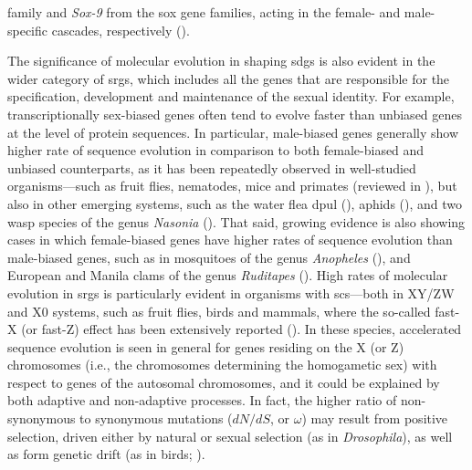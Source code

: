 family and \textit{Sox-9} from the \gls{sox} gene families, acting in the female- and male-specific cascades, respectively ().

The significance of molecular evolution in shaping \glspl{sdg} is also evident in the wider category of \glspl{srg}, which includes all the genes that are responsible for the specification, development and maintenance of the sexual identity. For example, transcriptionally sex-biased genes often tend to evolve faster than unbiased genes at the level of protein sequences. In particular, male-biased genes generally show higher rate of sequence evolution in comparison to both female-biased and unbiased counterparts, as it has been repeatedly observed in well-studied organisms---such as fruit flies, nematodes, mice and primates (reviewed in ), but also in other emerging systems, such as the water flea \gls{dpul} (), aphids (), and two wasp species of the genus \textit{Nasonia} (). That said, growing evidence is also showing cases in which female-biased genes have higher rates of sequence evolution than male-biased genes, such as in mosquitoes of the genus \textit{Anopheles} (), and European and Manila clams of the genus \textit{Ruditapes} (). High rates of molecular evolution in \glspl{srg} is particularly evident in organisms with \glspl{sc}---both in XY/ZW and X0 systems, such as fruit flies, birds and mammals, where the so-called fast-X (or fast-Z) effect has been extensively reported (). In these species, accelerated sequence evolution is seen in general for genes residing on the X (or Z) chromosomes (i.e., the chromosomes determining the homogametic sex) with respect to genes of the autosomal chromosomes, and it could be explained by both adaptive and non-adaptive processes. In fact, the higher ratio of non-synonymous to synonymous mutations ($dN/dS$, or $\omega$) may result from positive selection, driven either by natural or sexual selection (as in \textit{Drosophila}), as well as form genetic drift (as in birds; ).

